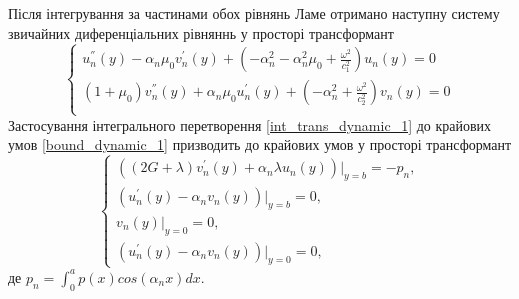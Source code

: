 Після інтегрування за частинами обох рівнянь Ламе отримано наступну систему звичайних диференціальних рівняннь у просторі трансформант
\begin{equation}\label{transf_dynamic_1}
    \begin{cases}
        u_n^{''}(y) - \alpha_n \mu_0 v_n^{'}(y) + (-\alpha_n^2 -\alpha_n^2 \mu_0 + \frac{\omega^2}{c_1^2}) u_n(y) = 0 \\
        (1 + \mu_0) v_n^{''}(y) + \alpha_n \mu_0 u_n^{'}(y) + (- \alpha_n^2 + \frac{\omega^2}{c_2^2}) v_n(y) = 0 \\
    \end{cases}
\end{equation}
Застосування інтегрального перетворення \eqref{int_trans_dynamic_1} до крайових умов \eqref{bound_dynamic_1} призводить до крайових умов у просторі трансформант
\begin{equation}\label{transf_bound_dynamic_1}
    \begin{cases}
        \left( (2G + \lambda)v_n^{'}(y) + \alpha_n \lambda u_n(y) \right)|_{y=b} = -p_n, \\
        \left(u_n^{'}(y) - \alpha_n v_n(y)  \right)|_{y=b} = 0, \\
        v_n(y)|_{y=0} = 0, \\
        \left(u_n^{'}(y) - \alpha_n v_n(y)  \right)|_{y=0} = 0,
    \end{cases}
\end{equation}
де $p_n = \int_{0}^{a} p(x) cos(\alpha_n x) dx$.

